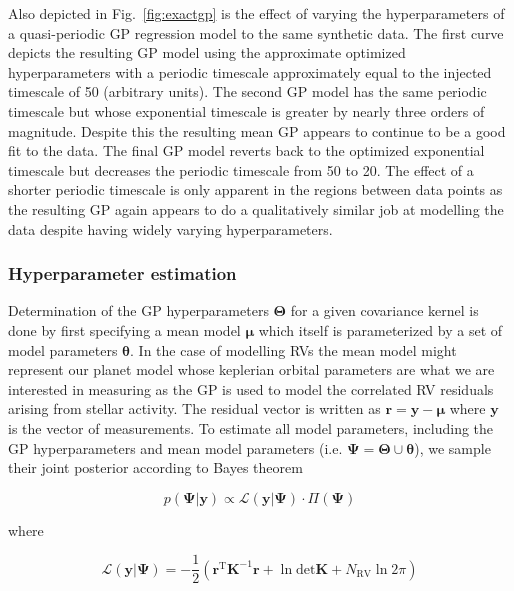 Also depicted in Fig.~\ref{fig:exactgp} is the effect of varying the hyperparameters of
a quasi-periodic GP regression model to the same synthetic data. The first curve depicts
the resulting GP model using the approximate optimized hyperparameters with a periodic
timescale approximately equal to the injected timescale of 50 (arbitrary units). The second
GP model has the same periodic timescale but whose exponential timescale is greater by nearly
three orders of magnitude. Despite this the resulting mean GP appears to continue to be a good
fit to the data. The final GP model reverts back to the optimized exponential timescale but
decreases the periodic timescale from 50 to 20. The effect of a shorter periodic timescale
is only apparent in the regions between data points as the resulting GP again appears to do
a qualitatively similar job at modelling the data despite having widely varying hyperparameters.


\subsubsection{Hyperparameter estimation}
Determination of the GP hyperparameters $\boldsymbol{\Theta}$ for a given covariance kernel is
done by first specifying a mean model $\boldsymbol{\mu}$ which itself is parameterized by
a set of model parameters $\boldsymbol{\theta}$. In the case of modelling RVs the mean model
might represent our planet model whose keplerian orbital parameters are what we are interested
in measuring as the GP is used to model the correlated RV residuals arising from stellar
activity. The residual vector is written as $\mathbf{r} = \mathbf{y} - \boldsymbol{\mu}$
where $\mathbf{y}$ is the vector of \nrv{} measurements. 
To estimate all model parameters, including the GP hyperparameters and mean model
parameters (i.e. $\boldsymbol{\Psi} = \boldsymbol{\Theta} \cup \boldsymbol{\theta}$),
we sample their joint posterior according to Bayes theorem

\begin{equation}
  p(\boldsymbol{\Psi}|\mathbf{y}) \propto \mathcal{L}(\mathbf{y}|\boldsymbol{\Psi}) \cdot
  \Pi(\boldsymbol{\Psi})
  \label{eq:bayess}
\end{equation}

\noindent where

\begin{equation}
  \mathcal{L}(\mathbf{y}|\boldsymbol{\Psi}) =
  -\frac{1}{2} \left( \mathbf{r}^{\text{T}} \mathbf{K}^{-1} \mathbf{r} +
  \ln{\text{det}\mathbf{K}} + N_{\text{RV}} \ln{2\pi} \right)
  \label{eq:lnlikeGP}
\end{equation}

